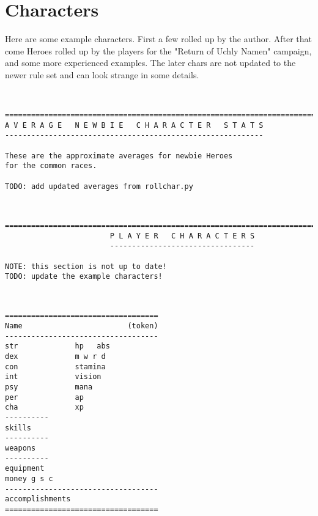 

\cleardoublepage

\chapter*{Characters}

Here are some example characters. First a few rolled up by the author. After that come Heroes rolled up by the players for the "Return of Uchly Namen" campaign, and some more experienced examples. The later chars are not updated to the newer rule set and can look strange in some details.

\


 {}
\tiny \begin{samepage} \begin{verbatim}
================================================================================
A V E R A G E   N E W B I E   C H A R A C T E R   S T A T S
-----------------------------------------------------------

These are the approximate averages for newbie Heroes
for the common races.

TODO: add updated averages from rollchar.py
\end{verbatim} \end{samepage} \normalsize

\

\pagebreak[1]
\tiny \begin{samepage} \begin{verbatim}
================================================================================
                        P L A Y E R   C H A R A C T E R S
                        ---------------------------------

NOTE: this section is not up to date!
TODO: update the example characters!
\end{verbatim} \end{samepage} \normalsize


\


\pagebreak[3]
\tiny \begin{samepage} \begin{verbatim}
===================================
Name                        (token)
-----------------------------------
str             hp   abs
dex             m w r d
con             stamina
int             vision
psy             mana
per             ap
cha             xp
----------
skills
----------
weapons
----------
equipment
money g s c
-----------------------------------
accomplishments
===================================
\end{verbatim} \end{samepage} \normalsize


